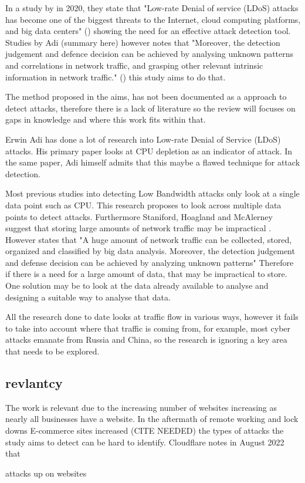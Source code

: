 In a study by \citeauthor{9016229} in 2020, they state that "Low-rate Denial of service (LDoS) attacks has become one of the biggest threats to the Internet, cloud computing platforms, and big data centers" (\cite{9016229}) showing the need for an effective attack detection tool. Studies by Adi (summary here) however \citeauthor{9016229} notes that "Moreover, the detection judgement and defence decision can be achieved by analysing unknown patterns and correlations in network traffic, and grasping other relevant intrinsic information in network traffic."  (\cite{9016229}) this study aims to do that.


The method proposed in the aims, has not been documented as a approach to detect attacks, therefore there is a lack of literature so the review will focuses on gaps in knowledge and where this work fits within that.


Erwin Adi has done a lot of research into Low-rate Denial of Service (LDoS) attacks. His primary paper looks at CPU depletion as an indicator of attack. In the same paper, Adi himself admits that this maybe a flawed technique for attack detection. \cite{Adi2016} 

Most previous studies into detecting Low Bandwidth attacks only look at a single data point such as CPU. This research proposes to look across multiple data points to detect attacks. Furthermore Staniford, Hoagland and McAlerney suggest that storing large amounts of network traffic may be impractical \cite{staniford2002practical}. However\citeauthor{9016229} states that "A huge amount of network traffic can be collected, stored, organized and classified by big data analysis. Moreover, the detection judgement and defense decision can be achieved by analyzing unknown patterns" \cite{9016229} Therefore if there is a need for a large amount of data, that may be impractical to store. One solution may be to look at the data already available to analyse and designing a suitable way to analyse that data.

All the research done to date looks at traffic flow in various ways, however it fails to take into account where that traffic is coming from, for example, most cyber attacks emanate from Russia and China, so the research is ignoring a key area that needs to be explored.

\subsection{revlantcy}
The work is relevant due to the increasing number of websites increasing as nearly all businesses have a website. In the aftermath of remote working and lock downs E-commerce sites increased (CITE NEEDED) the types of attacks the study aims to detect can be hard to identify. Cloudflare notes in August  2022 that 

attacks up on websites